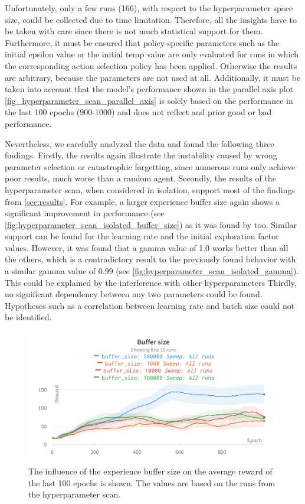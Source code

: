 \documentclass{article}
\begin{document}
Unfortunately, only a few runs (166), with respect to the hyperparameter space size, could be collected due to time limitation.
Therefore, all the insights have to be taken with care since there is not much statistical support for them.
Furthermore, it must be ensured that policy-specific parameters such as the initial epsilon value or the initial temp value are only evaluated for runs in which the corresponding action selection policy has been applied. 
Otherwise the results are arbitrary, because the parameters are not used at all.
Additionally, it must be taken into account that the model's performance shown in the parallel axis plot 
\autoref{fig_hyperparameter_scan_parallel_axis} is solely based on the performance in the last 100 epochs (900-1000) 
and does not reflect and prior good or bad performance.

Nevertheless, we carefully analyzed the data and found the following three findings.
Firstly, the results again illustrate the instability caused by wrong parameter selection or catastrophic forgetting, 
since numerous runs only achieve poor results, much worse than a random agent. 
Secondly, the results of the hyperparameter scan, when considered in isolation, 
support most of the findings from \autoref{sec:results}. 
For example, a larger experience buffer size again shows a significant improvement in performance (see \autoref{fig:hyperparameter_scan_isolated_buffer_size})
as it was found by \cite{DBLP:conf/icml/FedusRABLRD20} too. 
Similar support can be found for the learning rate and the initial exploration factor values.
However, it was found that a gamma value of 1.0 works better than all the others, 
which is a contradictory result to the previously found behavior with a similar gamma value of 0.99 (see \autoref{fig:hyperparameter_scan_isolated_gamma}).
This could be explained by the interference with other hyperparameters
Thirdly, no significant dependency between any two parameters could be found.
Hypotheses such as a correlation between learning rate and batch size could not be identified. 

\begin{figure}[ht!]
   \centering
   \includegraphics[width=\columnwidth]{assets/hyperparamter-scan/W&B Chart Buffer size.png}
   \caption{The influence of the experience buffer size on the average reward of the last 100 epochs is shown. The values are based on the runs from the hyperparameter scan.
   }
   \label{fig:hyperparameter_scan_isolated_buffer_size}
\end{figure}
\end{document}
